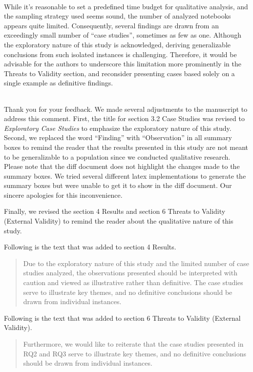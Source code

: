 \documentclass[11pt,fleqn]{article}
\newcommand{\eline}{\vspace*{.75\baselineskip}}
\newcommand{\Referee}[1]{\eline \noindent {\bf Reviewer comment #1:} \\}
\newcommand{\Us}{\eline \noindent {\bf Response:}\\}
\newenvironment{revcomment}[1][]
{\Referee{#1}\begin{rcomment}}
{\end{rcomment}}
\begin{document}
\begin{revcomment}[1.6]

  While it's reasonable to set a predefined time budget for qualitative analysis, and the sampling strategy used seems sound, the number of analyzed notebooks appears quite limited. Consequently, several findings are drawn from an exceedingly small number of ``case studies'', sometimes as few as one. Although the exploratory nature of this study is acknowledged, deriving generalizable conclusions from such isolated instances is challenging. Therefore, it would be advisable for the authors to underscore this limitation more prominently in the Threats to Validity section, and reconsider presenting cases based solely on a single example as definitive findings.
\end{revcomment}

\Us Thank you for your feedback. We made several adjustments to the manuscript to address this comment. First, the title for section 3.2 Case Studies was revised to \emph{Exploratory Case Studies} to emphasize the exploratory nature of this study. Second, we replaced the word ``Finding'' with ``Observation'' in all summary boxes to remind the reader that the results presented in this study are not meant to be generalizable to a population since we conducted qualitative research. Please note that the diff document does not highlight the changes made to the summary boxes. We tried several different latex implementations to generate the summary boxes but were unable to get it to show in the diff document. Our sincere apologies for this inconvenience.

Finally, we revised the section 4 Results and section 6 Threats to Validity (External Validity) to remind the reader about the qualitative nature of this study.

Following is the text that was added to section 4 Results.

\begin{quote}
  Due to the exploratory nature of this study and the limited number of case studies analyzed, the observations presented should be interpreted with caution and viewed as illustrative rather than definitive. The case studies serve to illustrate key themes, and no definitive conclusions should be drawn from individual instances.
\end{quote}

Following is the text that was added to section 6 Threats to Validity (External Validity).

\begin{quote}
  Furthermore, we would like to reiterate that the case studies presented in RQ2 and RQ3 serve to illustrate key themes, and no definitive conclusions should be drawn from individual instances.
\end{quote}
\end{document}
